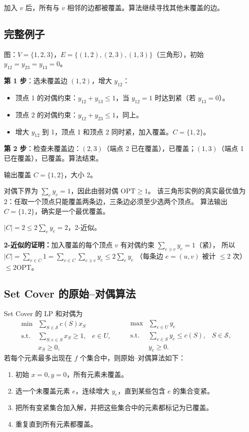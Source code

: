 \documentclass[UTF8,openany,12pt]{ctexbook}
\theoremstyle{remark}
\newcommand{\OPT}{\mathrm{OPT}}
\begin{document}
加入 \(v\) 后，所有与 \(v\) 相邻的边都被覆盖。算法继续寻找其他未覆盖的边。

\subsection{完整例子}

图：$V=\{1,2,3\}$，$E=\{(1,2),(2,3),(1,3)\}$（三角形），初始 $y_{12}=y_{23}=y_{13}=0$。

\textbf{第 1 步}：选未覆盖边 $(1,2)$，增大 $y_{12}$：
\begin{itemize}
  \item 顶点 1 的对偶约束：$y_{12}+y_{13} \le 1$，当 $y_{12}=1$ 时达到紧（若 $y_{13}=0$）。
  \item 顶点 2 的对偶约束：$y_{12}+y_{23} \le 1$，同上。
  \item 增大 $y_{12}$ 到 1，顶点 1 和顶点 2 同时紧，加入覆盖。$C=\{1,2\}$。
\end{itemize}

\textbf{第 2 步}：检查未覆盖边：$(2,3)$（端点 2 已在覆盖），已覆盖；$(1,3)$（端点 1 已在覆盖），已覆盖。算法结束。

输出覆盖 $C=\{1,2\}$，大小 2。

对偶下界为 $\sum_e y_e = 1$，因此由弱对偶 $\OPT \ge 1$。
该三角形实例的真实最优值为 $2$：任取一个顶点只能覆盖两条边，三条边必须至少选两个顶点。
算法输出 $C=\{1,2\}$，确实是一个最优覆盖。

$|C|=2 \le 2\sum_e y_e = 2$，2-近似。

\textbf{2-近似的证明：}加入覆盖的每个顶点 $v$ 有对偶约束 $\sum_{e \ni v} y_e = 1$（紧），
所以 $|C| = \sum_{v \in C} 1 = \sum_{v \in C} \sum_{e \ni v} y_e \le 2\sum_e y_e$
（每条边 $e=(u,v)$ 被计 $\le 2$ 次）$\le 2\OPT$。

\subsection{Set Cover 的原始--对偶算法}

Set Cover 的 LP 和对偶为
\[
\begin{array}{rll}
\min & \sum_{S\in\mathcal S}c(S)x_S\\
\text{s.t.} & \sum_{S:e\in S}x_S\ge1, & e\in U,\\
&x_S\ge0,
\end{array}
\qquad
\begin{array}{rll}
\max & \sum_{e\in U}y_e\\
\text{s.t.} & \sum_{e\in S}y_e\le c(S), & S\in\mathcal S,\\
&y_e\ge0.
\end{array}
\]
若每个元素最多出现在 $f$ 个集合中，则原始--对偶算法如下：
\begin{enumerate}
  \item 初始 $x=0,y=0$，所有元素未覆盖。
  \item 选一个未覆盖元素 $e$，连续增大 $y_e$，直到某些包含 $e$ 的集合变紧。
  \item 把所有变紧集合加入解，并把这些集合中的元素都标记为已覆盖。
  \item 重复直到所有元素都覆盖。
\end{enumerate}
\end{document}
